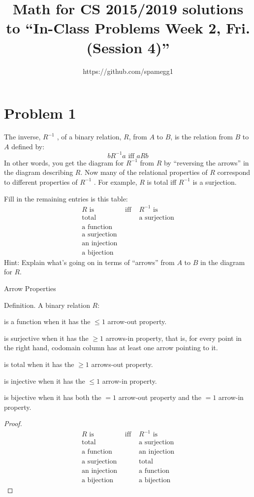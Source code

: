 \documentclass[14pt]{extarticle}
\title{Math for CS 2015/2019 solutions to ``In-Class Problems Week 2, Fri. (Session 4)''}
\author{https://github.com/spamegg1}
\begin{document}
\maketitle
\tableofcontents
\section{Problem 1}
The inverse, $R^{-1}$ , of a binary relation, $R$, from $A$ to $B$, is the relation from $B$ to $A$ defined by:
$$
b R^{-1}a \text{ iff } a R b
$$
In other words, you get the diagram for $R^{-1}$ from $R$ by “reversing the arrows” in the diagram describing $R$. Now many of the relational properties of $R$ correspond to different properties of $R^{-1}$ . For example, $R$ is total iff $R^{-1}$ is a surjection.

Fill in the remaining entries is this table:
$$
\begin{array}{c|cc}
R \text{ is}  & \text{ iff } & R^{-1} \text{ is} \\ 
\hline 
\text{total} &   & \text{a surjection} \\
\text{a function} &   &  \\
\text{a surjection} &   &  \\
\text{an injection} &   &  \\
\text{a bijection} &   & 
\end{array}
$$
Hint: Explain what’s going on in terms of “arrows” from $A$ to $B$ in the diagram for $R$.

Arrow Properties

Definition. A binary relation $R$:

is a function when it has the $\leq 1$ arrow-out property.

is surjective when it has the $\geq 1$ arrows-in property, that is, for every point in the right hand, codomain column has at least one arrow pointing to it.

is total when it has the $\geq 1$ arrows-out property.

is injective when it has the $\leq 1$ arrow-in property.

is bijective when it has both the $=1$ arrow-out property and the $=1$ arrow-in property.

\begin{proof}
$$
\begin{array}{c|cc}
R \text{ is}  & \text{ iff } & R^{-1} \text{ is} \\ 
\hline 
\text{total} &   & \text{a surjection} \\
\text{a function} &   & \text{an injection} \\
\text{a surjection} &   & \text{total} \\
\text{an injection} &   & \text{a function} \\
\text{a bijection} &   & \text{a bijection}
\end{array}
$$
\end{proof}
\end{document}

